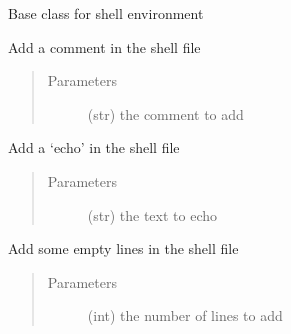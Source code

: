 \documentclass[a4paper,10pt,english]{sphinxmanual}
\begin{document}

\begin{fulllineitems}
\label{\detokenize{apidoc_src/src:src.fileEnviron.FileEnviron}}
Base class for shell environment

\begin{fulllineitems}
\label{\detokenize{apidoc_src/src:src.fileEnviron.FileEnviron.add_comment}}
Add a comment in the shell file
\begin{quote}\begin{description}
\item[{Parameters}] \leavevmode
{} \textendash{} (str) the comment to add

\end{description}\end{quote}

\end{fulllineitems}


\begin{fulllineitems}
\label{\detokenize{apidoc_src/src:src.fileEnviron.FileEnviron.add_echo}}
Add a ‘echo’ in the shell file
\begin{quote}\begin{description}
\item[{Parameters}] \leavevmode
{} \textendash{} (str) the text to echo

\end{description}\end{quote}

\end{fulllineitems}


\begin{fulllineitems}
\label{\detokenize{apidoc_src/src:src.fileEnviron.FileEnviron.add_line}}
Add some empty lines in the shell file
\begin{quote}\begin{description}
\item[{Parameters}] \leavevmode
{} \textendash{} (int) the number of lines to add


\end{description}
\end{quote}
\end{fulllineitems}
\end{fulllineitems}
\end{document}
